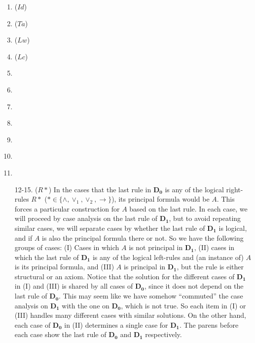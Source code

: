 \begin{enumerate}
	\item ($Id$) \label{c:id-*} 

	\item ($Ta$) \label{c:ta-*} 

	\item ($Lw$) \label{c:lw-*} 

	\item ($Lc$) \label{c:lc-*} 

	\item \label{c:cut-*} 

	\item \label{c:la1-*} 

	\item \label{c:la2-*} 
	
	\item \label{c:lo-*} 
	
	
	\item \label{c:li-*} 
	
	\item \label{c:rw-*} 
	
	\item \label{c:ln-*} 


	\item[12-15.] ($R*$) In the cases that the last rule in $\mathbf{D_0}$ is any of the logical right-rules $R*$ ($* \in \{ \land, \lor_1, \lor_2, \rightarrow\}$), its principal formula would be $A$. This forces a particular construction for $A$ based on the last rule. In each case, we will proceed by case analysis on the last rule of $\mathbf{D_1}$, but to avoid repeating similar cases, we will separate cases by whether the last rule of $\mathbf{D_1}$ is logical, and if $A$ is also the principal formula there or not. So we have the following groups of cases:
	(I) Cases in which $A$ is not principal in $\mathbf{D_1}$,
	(II) cases in which the last rule of $\mathbf{D_1}$ is any of the logical left-rules and (an instance of) $A$ is its principal formula, and (III) $A$ is principal in $\mathbf{D_1}$, but the rule is either structural or an axiom. Notice that the solution for the different cases of $\mathbf{D_1}$ in (I) and (III) is shared by all cases of $\mathbf{D_0}$, since it does not depend on the last rule of $\mathbf{D_0}$. This may seem like we have somehow ``commuted'' the case analysis on $\mathbf{D_1}$ with the one on $\mathbf{D_0}$, which is not true. So each item in (I) or (III) handles many different cases with similar solutions.
	On the other hand, each case of $\mathbf{D_0}$ in (II) determines a single case for $\mathbf{D_1}$. The parens before each case show the last rule of $\mathbf{D_0}$ and $\mathbf{D_1}$ respectively.



\end{enumerate}
